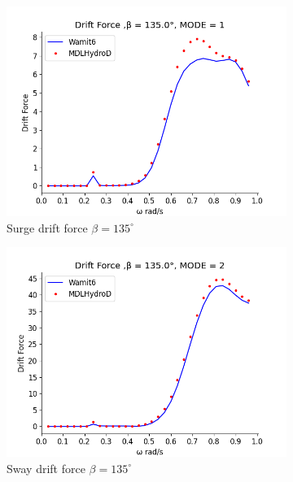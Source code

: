 \begin{figure}[H]
    \centering
    \begin{subfigure}[b]{0.49\textwidth}
        \includegraphics[width=\textwidth]{plots/kcs/drift/DrtFrc_9MODE_1.png}
        \caption{Surge drift force $\beta = 135^{\circ}$}
    \end{subfigure}
    \begin{subfigure}[b]{0.49\textwidth}
        \includegraphics[width=\textwidth]{plots/kcs/drift/DrtFrc_9MODE_2.png}
        \caption{Sway drift force $\beta = 135^{\circ}$}
    \end{subfigure}
    \\[0.5cm]
    \begin{subfigure}[b]{0.49\textwidth}

\end{subfigure}
\end{figure}
